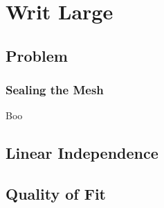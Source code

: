 % 

\section{Writ Large}

\subsection{Problem}
\begin{frame}\frametitle{Sealing the Mesh}
Boo
\end{frame}


\subsection{Linear Independence}
	
\subsection{Quality of Fit}

\endinput  %
